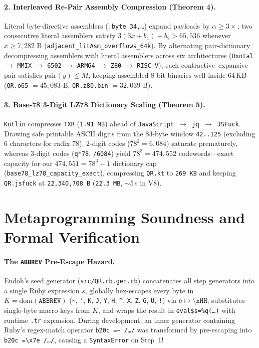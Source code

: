 \documentclass[10pt,twocolumn]{article}
\theoremstyle{definition}
\begin{document}
\paragraph{2. Interleaved Re-Pair Assembly Compression (Theorem 4).}
Literal byte-directive assemblers (\texttt{.byte 34,\dots}) expand payloads by $\alpha \ge 3\times$; two consecutive literal assemblers satisfy $3(3x + b_1) + b_2 > 65{,}536$ whenever $x \ge 7{,}282\text{ B}$ (\texttt{adjacent\_litAsm\_overflows\_64k}). By alternating pair-dictionary decompressing assemblers with literal assemblers across six architectures (\texttt{Uxntal} $\to$ \texttt{MMIX} $\to$ \texttt{6502} $\to$ \texttt{ARM64} $\to$ \texttt{Z80} $\to$ \texttt{RISC-V}), each contractive--expansive pair satisfies $\text{pair}(y) \le M$, keeping assembled 8-bit binaries well inside 64\,KB (\texttt{QR.o65} $= 45{,}083\text{ B}$, \texttt{QR.z80.bin} $= 32{,}039\text{ B}$).

\paragraph{3. Base-78 3-Digit LZ78 Dictionary Scaling (Theorem 5).}
\texttt{Kotlin} compresses \texttt{TXR} (\texttt{1.91 MB}) ahead of \texttt{JavaScript $\to$ jq $\to$ JSFuck}. Drawing safe printable ASCII digits from the 84-byte window \texttt{42..125} (excluding 6 characters for radix $78$), 2-digit codes ($78^2 = 6{,}084$) saturate prematurely, whereas 3-digit codes (\texttt{q*78}, \texttt{/6084}) yield $78^3 = 474{,}552$ codewords---exact capacity for our $474{,}551 = 78^3 - 1$ dictionary cap (\texttt{base78\_lz78\_capacity\_exact}), compressing \texttt{QR.kt} to \texttt{269 KB} and keeping \texttt{QR.jsfuck} at \texttt{22,340,708 B} (\texttt{22.3 MB}, $\sim$5\,s in V8).

\section{Metaprogramming Soundness and Formal Verification}
\label{sec:formal}

\paragraph{The \texttt{ABBREV} Pre-Escape Hazard.}
Endoh's seed generator (\texttt{src/QR.rb.gen.rb}) concatenates all step generators into a single Ruby expression $s$, globally hex-escapes every byte in $K = \text{dom}(\texttt{ABBREV})$ (\texttt{\textasciitilde}, \texttt{`}, \texttt{K}, \texttt{J}, \texttt{Y}, \texttt{H}, \texttt{\textasciicircum}, \texttt{X}, \texttt{Z}, \texttt{G}, \texttt{U}, \texttt{!}) via $b \mapsto \texttt{\textbackslash xHH}$, substitutes single-byte macro keys from $K$, and wraps the result in \texttt{eval\$s=\%q(\dots)} with runtime \texttt{.tr} expansion. During development, an inner generator containing Ruby's regex-match operator \texttt{b20c =\textasciitilde{} /\dots/} was transformed by pre-escaping into \texttt{b20c =\textbackslash x7e /\dots/}, causing a \texttt{SyntaxError} on Step~1!
\end{document}
